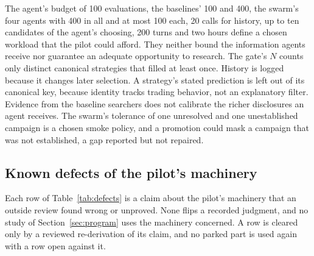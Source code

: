 \documentclass[11pt]{article}
\begin{document}
The agent's budget of 100 evaluations, the baselines' 100 and 400, the swarm's four agents with 400 in all and at most 100 each, 20 calls for history, up to ten candidates of the agent's choosing, 200 turns and two hours define a chosen workload that the pilot could afford. They neither bound the information agents receive nor guarantee an adequate opportunity to research. The gate's $N$ counts only distinct canonical strategies that filled at least once. History is logged because it changes later selection. A strategy's stated prediction is left out of its canonical key, because identity tracks trading behavior, not an explanatory filter. Evidence from the baseline searchers does not calibrate the richer disclosures an agent receives. The swarm's tolerance of one unresolved and one unestablished campaign is a chosen smoke policy, and a promotion could mask a campaign that was not established, a gap reported but not repaired.

\subsection{Known defects of the pilot's machinery}\label{app:defects}

Each row of Table~\ref{tab:defects} is a claim about the pilot's machinery that an outside review found wrong or unproved. None flips a recorded judgment, and no study of Section~\ref{sec:program} uses the machinery concerned. A row is cleared only by a reviewed re-derivation of its claim, and no parked part is used again with a row open against it.
\end{document}
